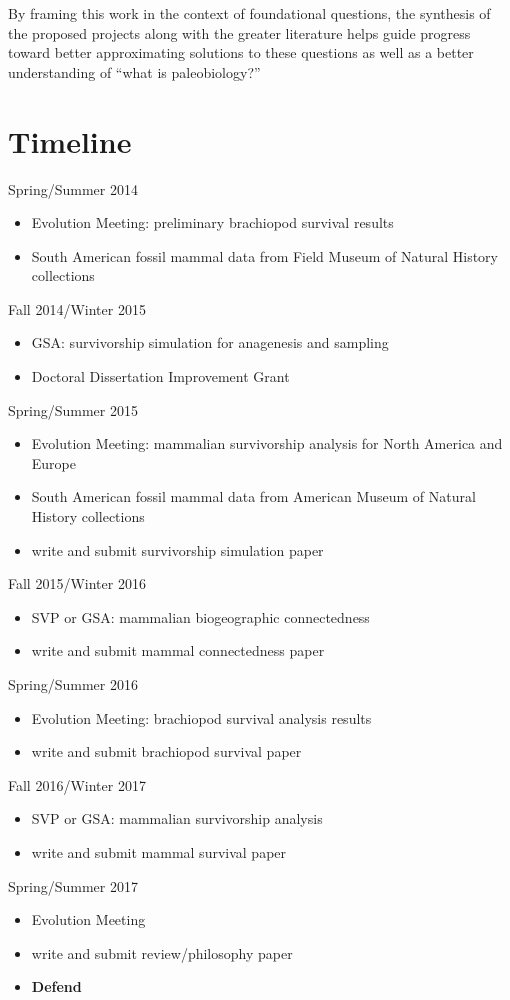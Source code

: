 \documentclass[12pt,letterpaper]{article}
\begin{document}
By framing this work in the context of foundational questions, the synthesis of the proposed projects along with the greater literature helps guide progress toward better approximating solutions to these questions as well as a better understanding of ``what is paleobiology?''


\clearpage
\section{Timeline}

Spring/Summer 2014
\begin{itemize}
  \item Evolution Meeting: preliminary brachiopod survival results
  \item South American fossil mammal data from Field Museum of Natural History collections
\end{itemize}

Fall 2014/Winter 2015
\begin{itemize}
  \item GSA: survivorship simulation for anagenesis and sampling
  \item Doctoral Dissertation Improvement Grant
\end{itemize}

Spring/Summer 2015
\begin{itemize}
  \item Evolution Meeting: mammalian survivorship analysis for North America and Europe
  \item South American fossil mammal data from American Museum of Natural History collections
  \item write and submit survivorship simulation paper
\end{itemize}

Fall 2015/Winter 2016
\begin{itemize}
  \item SVP or GSA: mammalian biogeographic connectedness
  \item write and submit mammal connectedness paper
\end{itemize}

Spring/Summer 2016
\begin{itemize}
  \item Evolution Meeting: brachiopod survival analysis results
  \item write and submit brachiopod survival paper
\end{itemize}

Fall 2016/Winter 2017
\begin{itemize}
  \item SVP or GSA: mammalian survivorship analysis
  \item write and submit mammal survival paper
\end{itemize}

Spring/Summer 2017
\begin{itemize}
  \item Evolution Meeting
  \item write and submit review/philosophy paper
  \item \textbf{Defend}
\end{itemize}



\clearpage


\end{document}
